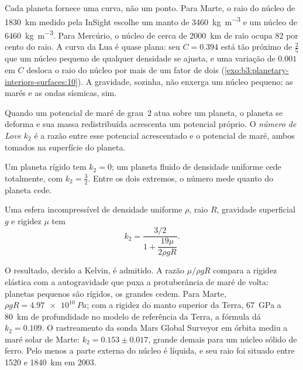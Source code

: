 Cada planeta fornece uma curva, não um ponto. Para Marte, o raio do núcleo de
\qty{1830}{km} medido pela InSight escolhe um manto de \qty{3460}{kg.m^{-3}}
e um núcleo de \qty{6460}{kg.m^{-3}}. Para Mercúrio, o núcleo de cerca de
\qty{2000}{km} de raio ocupa 82 por cento do raio. A curva da Lua é
quase plana: seu $C = 0.394$ está tão próximo de $\tfrac25$ que um núcleo pequeno
de qualquer densidade se ajusta, e uma variação de $0.001$ em $C$ desloca o raio
do núcleo por mais de um fator de dois (\cref{exo:b3:planetary-interiors-surfaces:10}).
A gravidade, sozinha, não enxerga um núcleo pequeno; as marés e as ondas sísmicas, sim.

\begin{definition}\label{def:b3:planetary-interiors-surfaces:love-number}
Quando um potencial de maré de grau~2 atua sobre um planeta, o planeta se deforma e
sua massa redistribuída acrescenta um potencial próprio. O \emph{número
de Love} $k_2$ é a razão entre esse potencial acrescentado e o
potencial de maré, ambos tomados na superfície do planeta.
\end{definition}

Um planeta rígido tem $k_2 = 0$; um planeta fluido de densidade uniforme cede
totalmente, com $k_2 = \tfrac32$. Entre os dois extremos, o número mede
quanto do planeta cede.

\begin{proposition}\label{prop:b3:planetary-interiors-surfaces:kelvin}
Uma esfera incompressível de densidade uniforme $\rho$, raio $R$, gravidade
superficial $g$ e rigidez $\mu$ tem
\[
  k_2 = \frac{3/2}{1 + \dfrac{19\mu}{2\rho g R}} .
\]
\end{proposition}

O resultado, devido a Kelvin, é admitido. A razão $\mu/\rho gR$ compara
a rigidez elástica com a autogravidade que puxa a protuberância de maré
de volta: planetas pequenos são rígidos, os grandes cedem. Para Marte, $\rho gR =
\qty{4.97e10}{Pa}$; com a rigidez do manto superior da Terra,
\qty{67}{GPa} a \qty{80}{km} de profundidade no modelo de referência da Terra, a
fórmula dá $k_2 = 0.109$. O rastreamento da sonda Mars Global Surveyor
em órbita mediu a maré solar de Marte: $k_2 = 0.153 \pm 0.017$, grande demais
para um núcleo sólido de ferro. Pelo menos a parte externa do núcleo é
líquida, e seu raio foi situado entre 1520 e \qty{1840}{km} em 2003.

